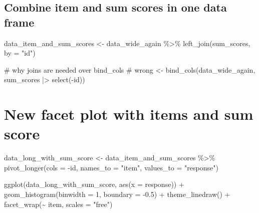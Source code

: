 \documentclass[
  letterpaper,
  DIV=11,
  numbers=noendperiod]{scrreprt}
\newenvironment{Shaded}{\begin{snugshade}}{\end{snugshade}}
\newcommand{\AttributeTok}[1]{\textcolor[rgb]{0.40,0.45,0.13}{#1}}
\newcommand{\CommentTok}[1]{\textcolor[rgb]{0.37,0.37,0.37}{#1}}
\newcommand{\DecValTok}[1]{\textcolor[rgb]{0.68,0.00,0.00}{#1}}
\newcommand{\FloatTok}[1]{\textcolor[rgb]{0.68,0.00,0.00}{#1}}
\newcommand{\FunctionTok}[1]{\textcolor[rgb]{0.28,0.35,0.67}{#1}}
\newcommand{\NormalTok}[1]{\textcolor[rgb]{0.00,0.23,0.31}{#1}}
\newcommand{\OtherTok}[1]{\textcolor[rgb]{0.00,0.23,0.31}{#1}}
\newcommand{\SpecialCharTok}[1]{\textcolor[rgb]{0.37,0.37,0.37}{#1}}
\newcommand{\StringTok}[1]{\textcolor[rgb]{0.13,0.47,0.30}{#1}}
\begin{document}
\subsection{Combine item and sum scores in one data
frame}\label{combine-item-and-sum-scores-in-one-data-frame}

\begin{Shaded}
\begin{Highlighting}[]
\NormalTok{data\_item\_and\_sum\_scores }\OtherTok{\textless{}{-}}\NormalTok{ data\_wide\_again }\SpecialCharTok{\%\textgreater{}\%}
  \FunctionTok{left\_join}\NormalTok{(sum\_scores, }\AttributeTok{by =} \StringTok{"id"}\NormalTok{)}

\CommentTok{\# why joins are needed over bind\_cols }
\CommentTok{\# wrong \textless{}{-} bind\_cols(data\_wide\_again, sum\_scores |\textgreater{} select({-}id))}
\end{Highlighting}
\end{Shaded}

\section{New facet plot with items and sum
score}\label{new-facet-plot-with-items-and-sum-score}

\begin{Shaded}
\begin{Highlighting}[]
\NormalTok{data\_long\_with\_sum\_score }\OtherTok{\textless{}{-}}\NormalTok{ data\_item\_and\_sum\_scores }\SpecialCharTok{\%\textgreater{}\%}
  \FunctionTok{pivot\_longer}\NormalTok{(}\AttributeTok{cols =} \SpecialCharTok{{-}}\NormalTok{id,}
               \AttributeTok{names\_to =} \StringTok{"item"}\NormalTok{,}
               \AttributeTok{values\_to =} \StringTok{"response"}\NormalTok{)}

\FunctionTok{ggplot}\NormalTok{(data\_long\_with\_sum\_score, }\FunctionTok{aes}\NormalTok{(}\AttributeTok{x =}\NormalTok{ response)) }\SpecialCharTok{+}
  \FunctionTok{geom\_histogram}\NormalTok{(}\AttributeTok{binwidth =} \DecValTok{1}\NormalTok{, }\AttributeTok{boundary =} \SpecialCharTok{{-}}\FloatTok{0.5}\NormalTok{) }\SpecialCharTok{+}
  \FunctionTok{theme\_linedraw}\NormalTok{() }\SpecialCharTok{+}
  \FunctionTok{facet\_wrap}\NormalTok{(}\SpecialCharTok{\textasciitilde{}}\NormalTok{ item, }\AttributeTok{scales =} \StringTok{"free"}\NormalTok{)}
\end{Highlighting}
\end{Shaded}
\end{document}
